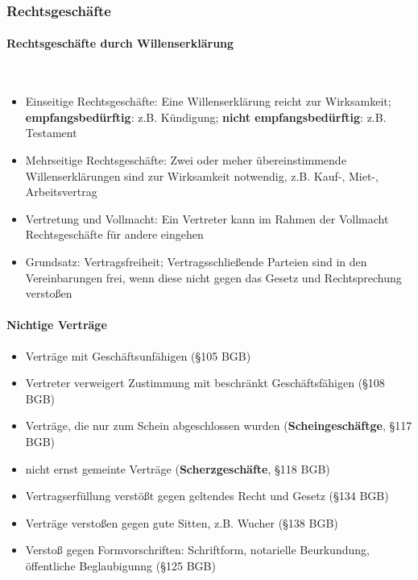 \subsubsection{Rechtsgeschäfte}

\paragraph{Rechtsgeschäfte durch Willenserklärung}~\\

\begin{itemize}
\setlength\itemsep{0em}
	\item Einseitige Rechtsgeschäfte: Eine Willenserklärung reicht zur Wirksamkeit; {\bf empfangsbedürftig}: z.B. Kündigung; {\bf nicht empfangsbedürftig}: z.B. Testament
	\item Mehrseitige Rechtsgeschäfte: Zwei oder meher übereinstimmende Willenserklärungen sind zur Wirksamkeit notwendig, z.B. Kauf-, Miet-, Arbeitsvertrag
	\item Vertretung und Vollmacht: Ein Vertreter kann im Rahmen der Vollmacht Rechtsgeschäfte für andere eingehen
	\item Grundsatz: Vertragsfreiheit; Vertragsschließende Parteien sind in den Vereinbarungen frei, wenn diese nicht gegen das Gesetz und Rechtsprechung verstoßen
\end{itemize}

\paragraph{Nichtige Verträge}

\begin{itemize}
\setlength\itemsep{0em}
	\item Verträge mit Geschäftsunfähigen (§105 BGB)
	\item Vertreter verweigert Zustimmung mit beschränkt Geschäftsfähigen (§108 BGB)
	\item Verträge, die nur zum Schein abgeschlossen wurden ({\bf Scheingeschäftge}, §117 BGB)
	\item nicht ernst gemeinte Verträge ({\bf Scherzgeschäfte}, §118 BGB)
	\item Vertragserfüllung verstößt gegen geltendes Recht und Gesetz (§134 BGB)
	\item Verträge verstoßen gegen gute Sitten, z.B. Wucher (§138 BGB)
	\item Verstoß gegen Formvorschriften: Schriftform, notarielle Beurkundung, öffentliche Beglaubigunng (§125 BGB)
\end{itemize}

